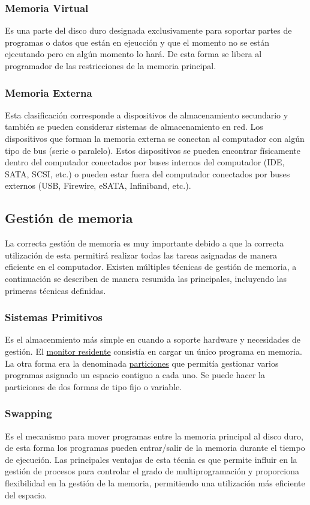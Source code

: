 \documentclass{article}
\begin{document}
\subsubsection{Memoria Virtual}
Es una parte del disco duro designada exclusivamente para soportar partes de programas o datos que están en ejeucción y que el momento no se están ejecutando pero en algún momento lo hará. De esta forma se libera al programador de las restricciones de la memoria principal.

\subsubsection{Memoria Externa}
Esta clasificación corresponde a dispositivos de almacenamiento secundario y también se pueden considerar sistemas de almacenamiento en red. Los dispositivos que forman la memoria externa se conectan al computador con algún tipo de bus (serie o paralelo). Estos dispositivos se pueden encontrar físicamente dentro del computador conectados por buses internos del computador (IDE, SATA, SCSI, etc.) o pueden estar fuera del computador conectados por buses externos (USB, Firewire, eSATA, Infiniband, etc.).\cite{Estructura}

\subsection{Gestión de memoria}
La correcta gestión de memoria es muy importante debido a que la correcta utilización de esta permitirá realizar todas las tareas asignadas de manera eficiente en el computador. Existen múltiples técnicas de gestión de memoria, a continuación se describen de manera resumida las principales, incluyendo las primeras técnicas definidas.\cite{Gestion}

\subsubsection{Sistemas Primitivos}
Es el almacenmiento más simple en cuando a soporte hardware y necesidades de gestión. El \underline{monitor residente} consistía en cargar un único programa en memoria. La otra forma era la denominada \underline{particiones} que permitía gestionar varios programas asignado un espacio contiguo a cada uno. Se puede hacer la particiones de dos formas de tipo fijo o variable.

\subsubsection{Swapping}
Es el mecanismo para mover programas entre la memoria principal al disco duro, de esta forma los programas pueden entrar/salir de la memoria durante el tiempo de ejecución. Las principales ventajas de esta técnia es que permite influir en la gestión de procesos para controlar el grado de multiprogramación y proporciona flexibilidad en la gestión de la memoria, permitiendo una utilización más eficiente del espacio.
\end{document}
